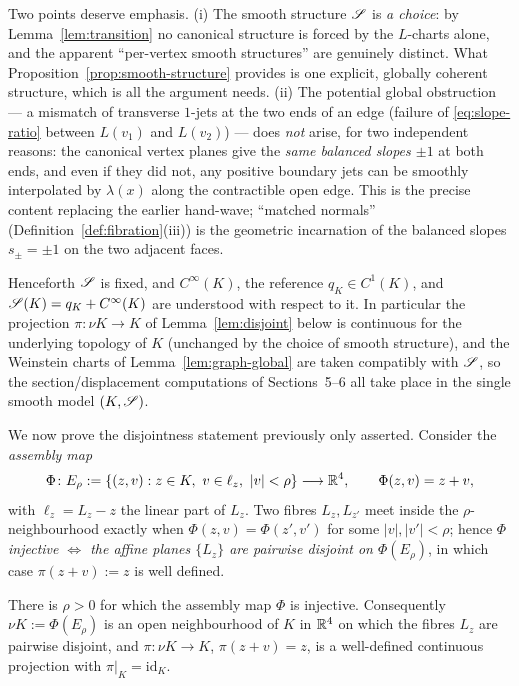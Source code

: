 \begin{qeightremark}\label{rem:why-fixed}
Two points deserve emphasis. (i) The smooth structure $\mathscr S$ is \emph{a choice}:
by Lemma~\ref{lem:transition} no canonical structure is forced by the $L$-charts
alone, and the apparent ``per-vertex smooth structures'' are genuinely distinct.
What Proposition~\ref{prop:smooth-structure} provides is one explicit, globally
coherent structure, which is all the argument needs. (ii) The potential global
obstruction --- a mismatch of transverse $1$-jets at the two ends of an edge
(failure of \eqref{eq:slope-ratio} between $L(v_1)$ and $L(v_2)$) --- does
\emph{not} arise, for two independent reasons: the canonical vertex planes give the
\emph{same balanced slopes $\pm1$} at both ends, and even if they did not, any
positive boundary jets can be smoothly interpolated by $\lambda(x)$ along the
contractible open edge. This is the precise content replacing the earlier
hand-wave; ``matched normals'' (Definition~\ref{def:fibration}(iii)) is the
geometric incarnation of the balanced slopes $s_\pm=\pm1$ on the two adjacent faces.
\end{qeightremark}

\noindent Henceforth $\mathscr S$ is fixed, and $C^\infty(K)$, the reference $q_K\in
C^1(K)$, and $\mathscr S(K)=q_K+C^\infty(K)$ are understood with respect to it. In
particular the projection $\pi\colon\nu K\to K$ of Lemma~\ref{lem:disjoint} below is
continuous for the underlying topology of $K$ (unchanged by the choice of smooth
structure), and the Weinstein charts of Lemma~\ref{lem:graph-global} are taken
compatibly with $\mathscr S$, so the section/displacement computations of Sections~5--6
all take place in the single smooth model $(K,\mathscr S)$.

We now prove the disjointness statement previously only asserted. Consider the
\emph{assembly map}
\[
\Phi\colon E_\rho:=\{(z,v):z\in K,\ v\in\ell_z,\ |v|<\rho\}\longrightarrow\qeightR^4,
\qquad \Phi(z,v)=z+v ,
\]
with $\ell_z=L_z-z$ the linear part of $L_z$. Two fibres $L_z,L_{z'}$ meet inside the
$\rho$-neighbourhood exactly when $\Phi(z,v)=\Phi(z',v')$ for some $|v|,|v'|<\rho$;
hence \emph{$\Phi$ injective $\iff$ the affine planes $\{L_z\}$ are pairwise disjoint
on $\Phi(E_\rho)$}, in which case $\pi(z+v):=z$ is well defined.

\begin{qeightlemma}\label{lem:disjoint}
There is $\rho>0$ for which the assembly map $\Phi$ is injective. Consequently
$\nu K:=\Phi(E_\rho)$ is an open neighbourhood of $K$ in $\mathbb{R}^4$ on which the
fibres $L_z$ are pairwise disjoint, and $\pi\colon\nu K\to K$, $\pi(z+v)=z$, is a
well-defined continuous projection with $\pi|_K=\mathrm{id}_K$.
\end{qeightlemma}

